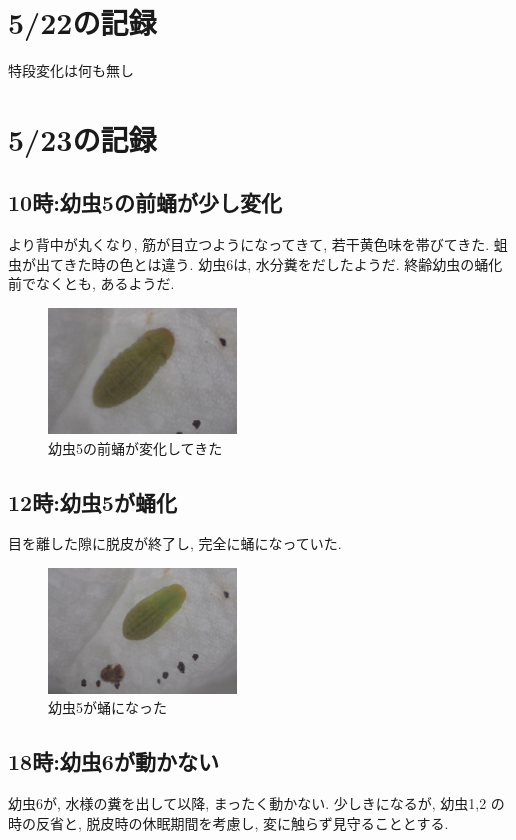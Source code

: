 \documentclass{jsarticle}
\begin{document}
\section{5/22の記録}
特段変化は何も無し

\section{5/23の記録}
\subsection{10時:幼虫5の前蛹が少し変化}
より背中が丸くなり, 筋が目立つようになってきて, 若干黄色味を帯びてきた. 蛆虫が出てきた時の色とは違う. 
幼虫6は, 水分糞をだしたようだ. 終齢幼虫の蛹化前でなくとも, あるようだ. 

\begin{figure}[htbp]
  \begin{center}
    \includegraphics[width=5cm]{photo9/Larva5-prePupa.JPG}
  \end{center}
  \caption{幼虫5の前蛹が変化してきた}
\end{figure}

\subsection{12時:幼虫5が蛹化}
目を離した隙に脱皮が終了し, 完全に蛹になっていた.

\begin{figure}[htbp]
  \begin{center}
    \includegraphics[width=5cm]{photo9/Larva5-pupa.JPG}
  \end{center}
  \caption{幼虫5が蛹になった}
\end{figure}

\subsection{18時:幼虫6が動かない}
幼虫6が, 水様の糞を出して以降, まったく動かない. 少しきになるが, 幼虫1,2 の時の反省と, 脱皮時の休眠期間を考慮し, 
変に触らず見守ることとする. 
\end{document}
